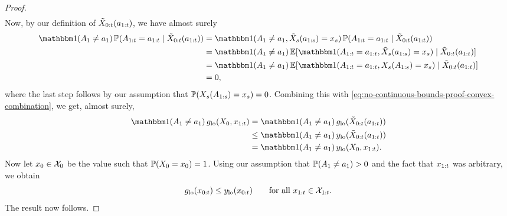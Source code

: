 \begin{proof}
\begin{align}
    \end{align}
    Now, by our definition of $\tilde{X}_{0:t}(a_{1:t})$, we have almost surely
    \begin{align*}
        \ind(\A_{1} \neq \ax_{1}) \, \Prob(\A_{1:\tx} = \ax_{1:\tx} \mid \tilde{\X}_{0:\tx}(\ax_{1:\tx}))
            &= \ind(\A_{1} \neq \ax_{1}, \tilde{\X}_{\sx}(\ax_{1:\sx}) = \xx_\sx) \, \Prob(\A_{1:\tx} = \ax_{1:\tx} \mid \tilde{\X}_{0:\tx}(\ax_{1:\tx})) \\
            &= \ind(\A_{1} \neq \ax_{1}) \, \E[\ind(\A_{1:\tx} = \ax_{1:\tx}, \tilde{\X}_{\sx}(\ax_{1:\sx}) = \xx_\sx) \mid \tilde{\X}_{0:\tx}(\ax_{1:\tx})] \\
            &= \ind(\A_{1} \neq \ax_{1}) \, \E[\ind(\A_{1:\tx} = \ax_{1:\tx}, \X_{\sx}(\A_{1:\sx}) = \xx_\sx) \mid \tilde{\X}_{0:\tx}(\ax_{1:\tx})] \\
            &= 0,
    \end{align*}
    where the last step follows by our assumption that $\mathbb{P}(X_{s}(A_{1:s}) = x_{s}) = 0$.
    Combining this with \eqref{eq:no-continuous-bounds-proof-convex-combination}, we get, almost surely,
    \begin{align}
        \ind(\A_{1} \neq \ax_{1}) \, \lo{\gx}(\X_{0}, \xx_{1:\tx}) &=  \ind(\A_{1} \neq \ax_{1}) \, \lo{\gx}(\tilde{\X}_{0:\tx}(\ax_{1:\tx})) \notag \\
            &\leq \ind(\A_{1} \neq \ax_{1}) \, \ylo(\tilde{\X}_{0:\tx}(\ax_{1:\tx})) \notag \\
            &= \ind(\A_{1} \neq \ax_{1}) \, \ylo(\X_{0}, \xx_{1:\tx}). \label{eq:no-continuous-bounds-intermediate-step}
    \end{align}
    Now let $x_0 \in \mathcal{X}_0$ be the value such that $\mathbb{P}(X_0 = x_0) = 1$.
    Using our assumption that $\mathbb{P}(A_1 \neq a_1) > 0$ and the fact that $x_{1:t}$ was arbitrary, we obtain
    \[
        g_{\mathrm{lo}}(x_{0:t}) \leq y_{\mathrm{lo}}(x_{0:t}) \qquad \text{for all $x_{1:t} \in \mathcal{X}_{1:t}$}.
    \]
    The result now follows.
\end{proof}


